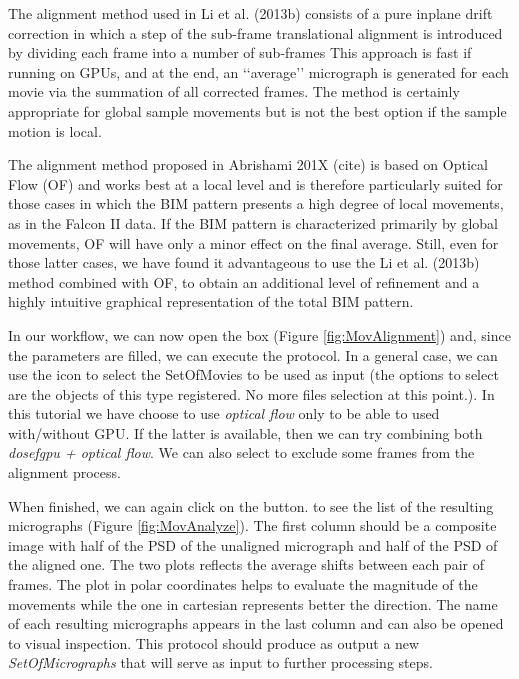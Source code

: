 \documentclass[12pt]{article} %
\begin{document}
The alignment method used in Li et al. (2013b) consists of a pure inplane drift correction in 
which a step of the sub-frame translational alignment is introduced by dividing each frame into a number of
sub-frames This approach is fast if running on GPUs, and at the end, an ‘‘average’’ micrograph is generated for each
movie via the summation of all corrected frames. The method is certainly appropriate for global sample movements
but is not the best option if the sample motion is local. 

The alignment method proposed in Abrishami 201X (cite) is based on Optical Flow (OF) and works best at a local level 
and is therefore particularly suited for those cases in which the BIM pattern presents a high degree of local movements, as in the Falcon II data.
If the BIM pattern is characterized primarily by global movements, OF will have only a minor effect on the final average. 
Still, even for those latter cases, we have found it advantageous to use the Li et al. (2013b) method combined with OF,
to obtain an additional level of refinement and a highly intuitive graphical representation of the total BIM pattern.

In our workflow, we can now open the  box (Figure \ref{fig:MovAlignment}) and, since the parameters are filled,
we can execute the protocol. In a general case, we can use the  icon to select the SetOfMovies to be used as input (the options
to select are the objects of this type registered. No more files selection at this point.). In this tutorial we have choose to use \emph{optical flow}
only to be able to used with/without GPU. If the latter is available, then we can try combining both \emph{dosefgpu + optical flow}.
We can also select to exclude some frames from the alignment process.

When finished, we can again click on the  button. to see the list of the resulting micrographs (Figure \ref{fig:MovAnalyze}).
The first column should be a composite image with half of the PSD of the unaligned micrograph and half of the PSD of the aligned one.
The two plots reflects the average shifts between each pair of frames. The plot in polar coordinates helps to evaluate the magnitude of the movements
while the one in cartesian represents better the direction. The name of each resulting micrographs appears in the last column and can also be opened to 
visual inspection. This protocol should produce as output a new \emph{SetOfMicrographs} that will serve as input to further processing steps.
\end{document}
